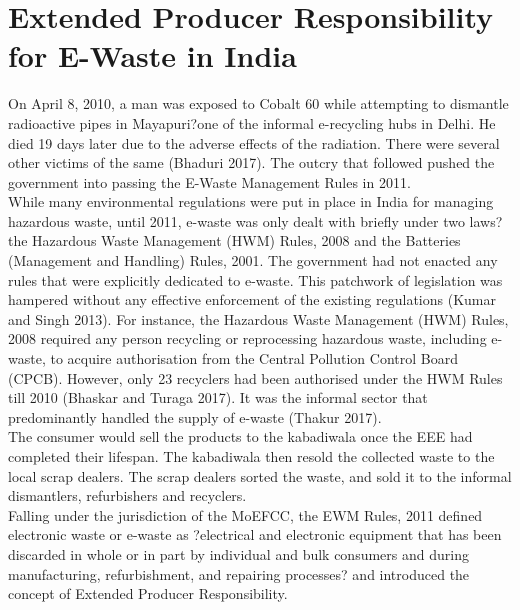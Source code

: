 \documentclass[a4paper, 12pt]{article}
\begin{document}
                    \section{Extended Producer Responsibility for E-Waste in India}
                    
                    On April 8, 2010, a man was exposed to Cobalt 60 while attempting to dismantle radioactive pipes in Mayapuri?one of the informal e-recycling hubs in Delhi. He died 19 days later due to the adverse effects of the radiation. There were several other victims of the same (Bhaduri 2017). The outcry that followed pushed the government into passing the E-Waste Management Rules in 2011. \\
                    
                    While many environmental regulations were put in place in India for managing hazardous waste, until 2011, e-waste was only dealt with briefly under two laws?the Hazardous Waste Management (HWM) Rules, 2008 and the Batteries (Management and Handling) Rules, 2001. The government had not enacted any rules that were explicitly dedicated to e-waste. This patchwork of legislation was hampered without any effective enforcement of the existing regulations (Kumar and Singh 2013). For instance, the Hazardous Waste Management (HWM) Rules, 2008 required any person recycling or reprocessing hazardous waste, including e-waste, to acquire authorisation from the Central Pollution Control Board (CPCB). However, only 23 recyclers had been authorised under the HWM Rules till 2010 (Bhaskar and Turaga 2017). It was the informal sector that predominantly handled the supply of e-waste (Thakur 2017). \\
                    
                    The consumer would sell the products to the kabadiwala once the EEE had completed their lifespan. The kabadiwala then resold the collected waste to the local scrap dealers. The scrap dealers sorted the waste, and sold it to the informal dismantlers, refurbishers and recyclers. \\
                    
                    Falling under the jurisdiction of the MoEFCC, the EWM Rules, 2011 defined electronic waste or e-waste as ?electrical and electronic equipment that has been discarded in whole or in part by individual and bulk consumers and during manufacturing, refurbishment, and repairing processes? and introduced the concept of Extended Producer Responsibility. \\
                    
\end{document}
